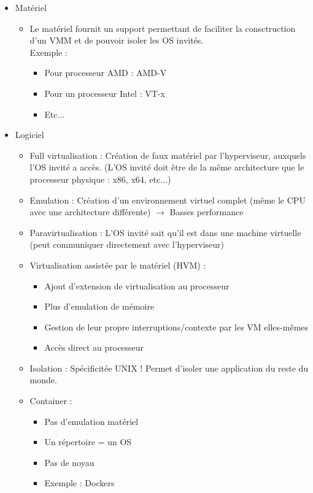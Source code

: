 \documentclass[a4paper]{article}
\begin{document}
      \begin{itemize}
        \item Matériel
        \begin{itemize}
          \item Le matériel fournit un support permettant de faciliter la consctruction d'un VMM et de pouvoir isoler les OS invités.\\
          Exemple :
        \begin{itemize}
          \item Pour processeur AMD : AMD-V
          \item Pour un processeur Intel : VT-x
          \item Etc...
        \end{itemize}
        \end{itemize}
        \item Logiciel
        \begin{itemize}
          \item Full virtualisation : Création de faux matériel par l'hyperviseur, auxquels l'OS invité a accès. 
          (L'OS invité doit être de la même architecture que le processeur physique : x86, x64, etc...)
          \item Emulation : Création d'un environnement virtuel complet (même le CPU avec une architecture différente) $\rightarrow$ Basses performance
          \item Paravirtualisation : L'OS invité sait qu'il est dans une machine virtuelle (peut communiquer directement avec l'hyperviseur)
          \item Virtualisation assistée par le matériel (HVM) : 
          \begin{itemize}
            \item Ajout d’extension de virtualisation au processeur
            \item Plus d'emulation de mémoire
            \item Gestion de leur propre interruptions/contexte par les VM elles-mêmes
            \item Accès direct au processeur
          \end{itemize}
          \item Isolation : Spécificitée UNIX ! Permet d'isoler une application du reste du monde.
          \item Container :
          \begin{itemize}
            \item Pas d'emulation matériel
            \item Un répertoire = un OS
            \item Pas de noyau
            \item Exemple : Dockers
          \end{itemize}
        \end{itemize}

      \end{itemize}
\end{document}
